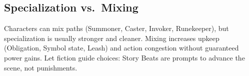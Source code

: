 \subsection{Specialization vs.\ Mixing}
\label{subsec:mixing}
Characters can mix paths (Summoner, Caster, Invoker, Runekeeper), but specialization is usually stronger and cleaner. Mixing increases upkeep (Obligation, Symbol state, Leash) and action congestion without guaranteed power gains. Let fiction guide choices: Story Beats are prompts to advance the scene, not punishments.














